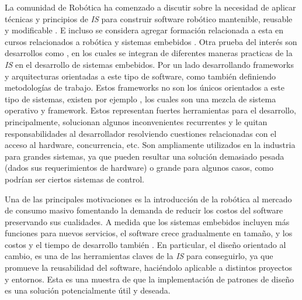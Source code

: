 La comunidad de Robótica ha comenzado a discutir sobre la necesidad de aplicar técnicas y principios de \textit{IS} para construir software robótico mantenible, reusable y modificable \cite{mejoras-1, mejoras-2}. E incluso se considera agregar formación relacionada a esta en cursos relacionados a robótica y sistemas embebidos \cite{Shin15fase}. Otra prueba del interés son desarrollos como \cite{FernandezMadrigal2003, model,model2,model3}, en los cuales se integran de diferentes maneras practicas de la \textit{IS} en el desarrollo de sistemas embebidos. Por un lado desarrollando \glspl{framework} y arquitecturas orientadas a este tipo de software, como también definiendo metodologías de trabajo. Estos \glspl{framework} no son los únicos orientados a este tipo de sistemas, existen por ejemplo \cite{framework-1, framework-ros}, los cuales son una mezcla de sistema operativo y framework. Estos representan fuertes herramientas para el desarrollo, principalmente, solucionan algunos inconvenientes recurrentes y le quitan responsabilidades al desarrollador resolviendo cuestiones relacionadas con el acceso al hardware, concurrencia, etc. Son ampliamente utilizados en la industria para grandes sistemas, ya que pueden resultar una solución demasiado pesada (dados sus requerimientos de hardware) o grande para algunos casos, como podrían ser ciertos sistemas de control.

Una de las principales motivaciones es la introducción de la robótica al mercado de consumo masivo fomentando la demanda de reducir los costos del software preservando sus cualidades. A medida que los sistemas embebidos incluyen más funciones para nuevos servicios, el software crece gradualmente en tamaño, y los costos y el tiempo de desarrollo también \cite{model2}. En particular, el diseño orientado al cambio, es una de las herramientas claves de la \textit{IS} para conseguirlo, ya que promueve la reusabilidad del software, haciéndolo aplicable a distintos proyectos y entornos. Esta es una muestra de que la implementación de patrones de diseño es una solución potencialmente útil y deseada.

